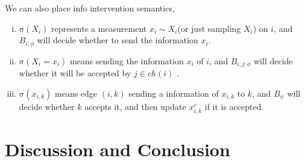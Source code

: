 \documentclass[letterpaper, onecolumn]{article}
\newcommand{\info}{\mathrm{\sigma}}
\begin{document}
\begin{CJK*}{UTF8}{gbsn}
\begin{Def}
	We can also place info intervention semantics,
	\begin{enumerate}[(i)]
	\setlength\itemsep{0em}
	\item $\info(X_i)$ represents a measurement $x_i \sim X_i$(or just sampling $X_i$) on $i$, and $B_{i; \phi}$ will decide whether to send the information $x_i$.
	\item $\info(X_i = x_i)$ means sending the information $x_i$ of $i$, and $B_{i, j; \phi}$ will decide whether it will be accepted by $j\in ch(i)$ . 
	\item $\info(x_{i,k})$ means edge $(i, k)$ sending a information of $x_{i, k}$ to $k$, and $B_\psi$ will decide whether $k$ accepts it, and then update $x^c_{i, k}$ if it is accepted. 
	\end{enumerate}	
\end{Def}

\section{Discussion and Conclusion}

		
		

\small


\newpage
\appendix
\normalsize
\end{CJK*}
\end{document}
